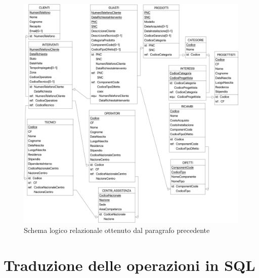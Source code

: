 \documentclass[a4paper, 12pt]{report}
\begin{document}
\begin{figure}[H]
	\centering
	\includegraphics[width=\linewidth]{images/logic.png}
	\caption{Schema logico relazionale ottenuto dal paragrafo precedente}
\end{figure}

\section{Traduzione delle operazioni in SQL}
\end{document}
